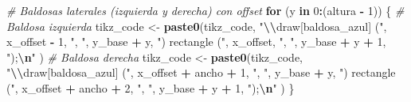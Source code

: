 \documentclass[
]{article}
\newenvironment{Shaded}{\begin{snugshade}}{\end{snugshade}}
\newcommand{\CommentTok}[1]{\textcolor[rgb]{0.56,0.35,0.01}{\textit{#1}}}
\newcommand{\ControlFlowTok}[1]{\textcolor[rgb]{0.13,0.29,0.53}{\textbf{#1}}}
\newcommand{\DecValTok}[1]{\textcolor[rgb]{0.00,0.00,0.81}{#1}}
\newcommand{\FunctionTok}[1]{\textcolor[rgb]{0.13,0.29,0.53}{\textbf{#1}}}
\newcommand{\NormalTok}[1]{#1}
\newcommand{\OtherTok}[1]{\textcolor[rgb]{0.56,0.35,0.01}{#1}}
\newcommand{\SpecialCharTok}[1]{\textcolor[rgb]{0.81,0.36,0.00}{\textbf{#1}}}
\newcommand{\StringTok}[1]{\textcolor[rgb]{0.31,0.60,0.02}{#1}}
\begin{document}
\begin{Shaded}
\begin{Highlighting}[]
    \CommentTok{\# Baldosas laterales (izquierda y derecha) con offset}
    \ControlFlowTok{for}\NormalTok{ (y }\ControlFlowTok{in} \DecValTok{0}\SpecialCharTok{:}\NormalTok{(altura }\SpecialCharTok{{-}} \DecValTok{1}\NormalTok{)) \{}
      \CommentTok{\# Baldosa izquierda}
\NormalTok{      tikz\_code }\OtherTok{\textless{}{-}} \FunctionTok{paste0}\NormalTok{(tikz\_code,}
        \StringTok{"}\SpecialCharTok{\textbackslash{}\textbackslash{}}\StringTok{draw[baldosa\_azul] ("}\NormalTok{, x\_offset }\SpecialCharTok{{-}} \DecValTok{1}\NormalTok{, }\StringTok{", "}\NormalTok{, y\_base }\SpecialCharTok{+}\NormalTok{ y, }\StringTok{") rectangle ("}\NormalTok{, x\_offset, }\StringTok{", "}\NormalTok{, y\_base }\SpecialCharTok{+}\NormalTok{ y }\SpecialCharTok{+} \DecValTok{1}\NormalTok{, }\StringTok{");}\SpecialCharTok{\textbackslash{}n}\StringTok{"}
\NormalTok{      )}
      \CommentTok{\# Baldosa derecha}
\NormalTok{      tikz\_code }\OtherTok{\textless{}{-}} \FunctionTok{paste0}\NormalTok{(tikz\_code,}
        \StringTok{"}\SpecialCharTok{\textbackslash{}\textbackslash{}}\StringTok{draw[baldosa\_azul] ("}\NormalTok{, x\_offset }\SpecialCharTok{+}\NormalTok{ ancho }\SpecialCharTok{+} \DecValTok{1}\NormalTok{, }\StringTok{", "}\NormalTok{, y\_base }\SpecialCharTok{+}\NormalTok{ y, }\StringTok{") rectangle ("}\NormalTok{, x\_offset }\SpecialCharTok{+}\NormalTok{ ancho }\SpecialCharTok{+} \DecValTok{2}\NormalTok{, }\StringTok{", "}\NormalTok{, y\_base }\SpecialCharTok{+}\NormalTok{ y }\SpecialCharTok{+} \DecValTok{1}\NormalTok{, }\StringTok{");}\SpecialCharTok{\textbackslash{}n}\StringTok{"}
\NormalTok{      )}
\NormalTok{    \}}
    

\end{Highlighting}
\end{Shaded}
\end{document}
